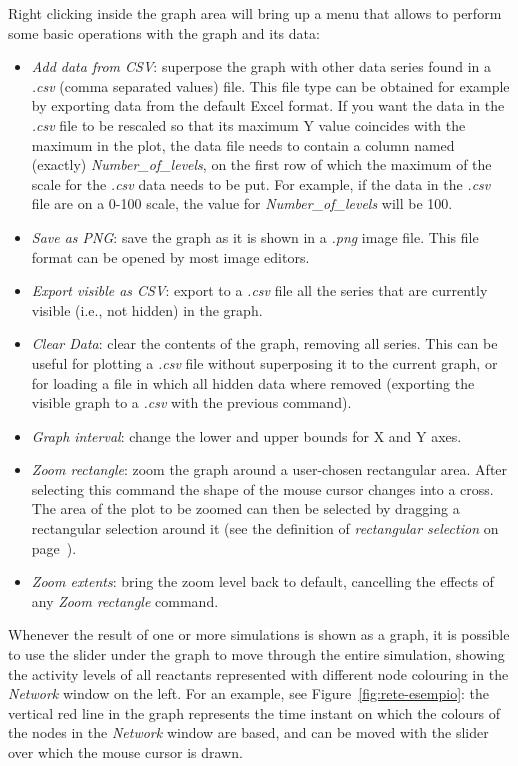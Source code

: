 \documentclass{article}
\begin{document}
Right clicking inside the graph area will bring up a menu that allows to perform some basic operations with the graph
and its data:
\begin{itemize}
  \item \emph{Add data from CSV}: \label{csv-import-format}superpose the graph with other data series found in a \emph{.csv} (comma separated values) file. This file type can be
obtained for example by exporting data from the default Excel format. If you want the data in the \emph{.csv} file to be rescaled so
that its maximum Y value coincides with the maximum in the plot, the data file needs to contain a column named (exactly)
\emph{Number\_{}of\_{}levels}, on the first row of which the maximum of the scale for the \emph{.csv} data needs to be put. For example,
if the data in the \emph{.csv} file are on a 0-100 scale, the value for \emph{Number\_{}of\_{}levels} will be 100.
  \item \emph{Save as PNG}: save the graph as it is shown in a \emph{.png} image file. This file format can be opened by most
image editors.
  \item \emph{Export visible as CSV}: export to a \emph{.csv} file all the series that are currently visible (i.e., not hidden)
in the graph.
  \item \emph{Clear Data}: clear the contents of the graph, removing all series. This can be useful for plotting
a \emph{.csv} file without superposing it to the current graph, or for loading a file in which all hidden data where removed
(exporting the visible graph to a \emph{.csv} with the previous command).
  \item \emph{Graph interval}: change the lower and upper bounds for X and Y axes.
  \item \emph{Zoom rectangle}: zoom the graph around a user-chosen rectangular area.
    After selecting this command the shape of the mouse cursor changes into a cross. The area of the plot to be
    zoomed can then be selected by dragging a rectangular selection around it (see the definition of \emph{rectangular
    selection} on page~\pageref{nota:rectangular-selection}).
  \item \emph{Zoom extents}: bring the zoom level back to default, cancelling the effects of any \emph{Zoom rectangle}
command.
\end{itemize}

Whenever the result of one or more simulations is shown as a graph, it is possible to use the slider under the graph to
move through the entire simulation, showing the activity levels of all reactants represented with different node colouring in
the \emph{Network} window on the left. For an example, see Figure~\ref{fig:rete-esempio}: the vertical red line in the
graph represents the time instant on which the colours of the nodes in the \emph{Network} window are based, and can
be moved with the slider over which the mouse cursor is drawn.
\end{document}
